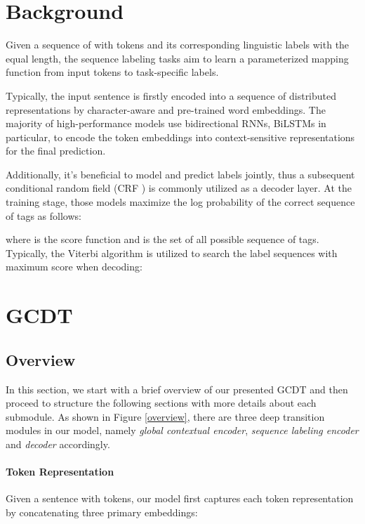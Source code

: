 \documentclass[11pt,a4paper]{article}
\begin{document}
\section{Background}
Given a sequence of  with  tokens and its corresponding linguistic labels  with the equal length, the sequence labeling tasks aim to learn a parameterized mapping function  from input tokens to task-specific labels.

Typically, the input sentence is firstly encoded into a sequence of distributed representations  by character-aware and pre-trained word embeddings.
The majority of high-performance models use bidirectional RNNs, BiLSTMs in particular, to encode the token embeddings  into context-sensitive representations for the final prediction. 

Additionally, it's beneficial to model and predict labels jointly, thus a subsequent conditional random field (CRF \citealp{CRF}) is commonly utilized as a decoder layer. At the training stage, those models maximize the log probability of the correct sequence of tags as follows: 

where  is the score function and  is the set of all possible sequence of tags. Typically, the Viterbi algorithm \cite{viterbi} is utilized to search the label sequences with maximum score when decoding:


\section{GCDT}

\subsection{Overview}
In this section, we start with a brief overview of our presented GCDT and then proceed to structure the following sections with more details about each submodule. As shown in Figure \ref{overview}, there are three deep transition modules in our model, namely \emph{global contextual encoder}, \emph{sequence labeling encoder} and \emph{decoder} accordingly. 
\paragraph{Token Representation}
Given a sentence  with  tokens,
our model first captures each token representation  by concatenating three primary embeddings: 
\end{document}
